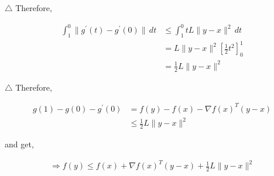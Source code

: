 \documentclass[a4paper,12pt]{article}
\begin{document}
\noindent $\triangle$
Therefore,

\begin{align*}
   \int_{1}^{0} \|g^{'}(t)-g^{'}(0)\| \,dt 
   &\leq \int_{1}^{0} tL \|y-x\|^{2} \,dt \\
   &=L\|y-x\|^{2} [\frac{1}{2} t^2]^1_0 \\
   &=\frac{1}{2}L \|y-x\|^{2}
\end{align*}

\noindent $\triangle$
Therefore,

\begin{align*}
   g(1) - g(0) - g^{'}(0) &= f(y) - f(x) - \nabla f(x)^{T}(y-x) \\
   &\leq \frac{1}{2} L \|y-x\|^{2} 
\end{align*}

and get,

\begin{align*}
   \Rightarrow f(y) \leq f(x) + \nabla f(x)^{T}(y-x) + \frac{1}{2}L\|y-x\|^{2}
\end{align*}





\end{document}
